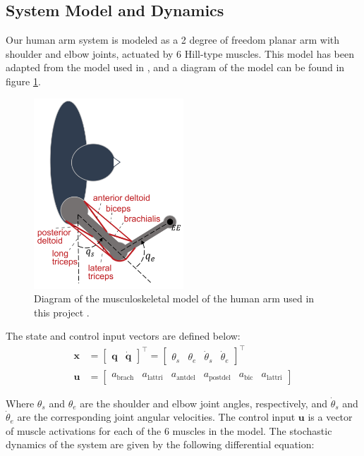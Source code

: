 \documentclass[table,12pt]{article}
\begin{document}
\subsection{System Model and Dynamics}
Our human arm system is modeled as a 2 degree of freedom planar arm with shoulder and elbow joints, actuated by 6 Hill-type muscles. This model has been adapted from the model used in \cite{c7}, and a diagram of the model can be found in figure \ref{fig:arm_model}. 

\begin{figure}[H]
    \centering
    \includegraphics[width=0.5\textwidth]{arm_model_diagram.png}
    \caption{Diagram of the musculoskeletal model of the human arm used in this project \cite{c7}.}
    \label{fig:arm_model}
\end{figure}

The state and control input vectors are defined below:
\begin{align}
    \mathbf{x} &= \begin{bmatrix}
        \mathbf{q} &
        \dot{\mathbf{q}}
    \end{bmatrix}^\top = \begin{bmatrix}
        \theta_s &
        \theta_e &
        \dot{\theta}_s &
        \dot{\theta}_e
    \end{bmatrix}^\top \\
    \mathbf{u} &= \begin{bmatrix}
        a_{\text{brach}} & a_{\text{lattri}} & a_{\text{antdel}} & a_{\text{postdel}} & a_{\text{bic}} & a_{\text{lattri}}
    \end{bmatrix}
\end{align}

Where $\theta_s$ and $\theta_e$ are the shoulder and elbow joint angles, respectively, and $\dot{\theta}_s$ and $\dot{\theta}_e$ are the corresponding joint angular velocities. The control input $\mathbf{u}$ is a vector of muscle activations for each of the 6 muscles in the model. The stochastic dynamics of the system are given by the following differential equation:
\end{document}
